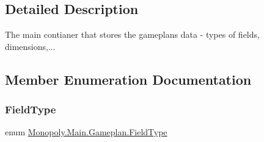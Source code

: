 \subsection{Detailed Description}
The main contianer that stores the gameplan\textquotesingle{}s data -\/ types of fields, dimensions,... 

\subsection{Member Enumeration Documentation}
\mbox{\label{class_monopoly_1_1_main_1_1_gameplan_a460f9e6d576d65d9ad9fe2b291ee2344}} 
\subsubsection{\texorpdfstring{Field\+Type}{FieldType}}
{\footnotesize\ttfamily enum \mbox{\hyperlink{class_monopoly_1_1_main_1_1_gameplan_a460f9e6d576d65d9ad9fe2b291ee2344}{Monopoly.\+Main.\+Gameplan.\+Field\+Type}}\hspace{0.3cm}{\ttfamily [strong]}}


